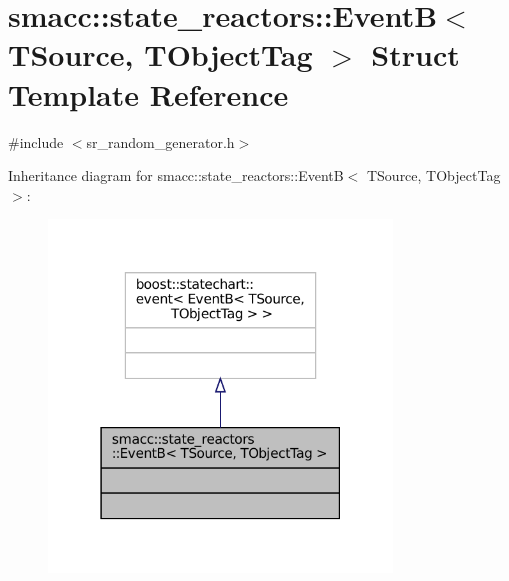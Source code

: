 \hypertarget{structsmacc_1_1state__reactors_1_1EventB}{}\section{smacc\+:\+:state\+\_\+reactors\+:\+:EventB$<$ T\+Source, T\+Object\+Tag $>$ Struct Template Reference}
\label{structsmacc_1_1state__reactors_1_1EventB}


{\ttfamily \#include $<$sr\+\_\+random\+\_\+generator.\+h$>$}



Inheritance diagram for smacc\+:\+:state\+\_\+reactors\+:\+:EventB$<$ T\+Source, T\+Object\+Tag $>$\+:
\nopagebreak
\begin{figure}[H]
\begin{center}
\leavevmode
\includegraphics[width=259pt]{structsmacc_1_1state__reactors_1_1EventB__inherit__graph}
\end{center}
\end{figure}



